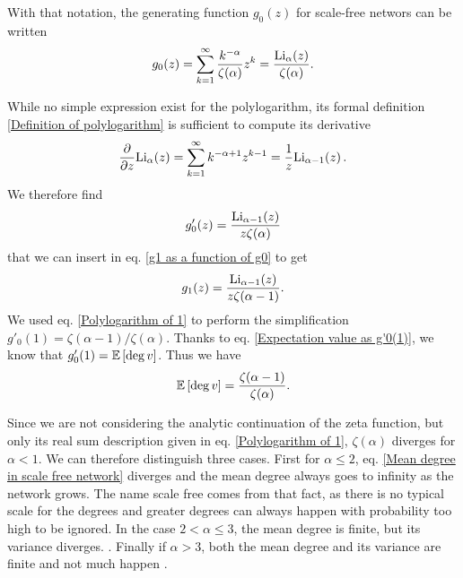 \documentclass[
11pt, %
english, %
singlespacing, %
nolistspacing, %
liststotoc, %
headsepline, %
]{MastersDoctoralThesis} %
\begin{document}
With that notation, the generating function $g_0(z)$ for scale-free networs can be written
\begin{align}
	g_0(z) = \sum_{k=1}^\infty \frac{k^{-\alpha}}{\zeta(\alpha)} z^k = \frac{\mathrm{Li}_{\alpha}\!\left(z\right)}{\zeta(\alpha)}. \label{Generating function for scale free networks}
\end{align}

While no simple expression exist for the polylogarithm, its formal definition \eqref{Definition of polylogarithm} is sufficient to compute its derivative
\begin{align}
	\frac{\partial}{\partial z} \mathrm{Li}_{\alpha}\!\left(z\right) = \sum_{k = 1}^\infty k^{-\alpha + 1} z^{k-1} = \frac{1}{z} \mathrm{Li}_{\alpha - 1}\!\left(z\right). \label{Derivative of the polylogarithm}
\end{align}
We therefore find
\begin{align}
	g'_0(z) = \frac{\mathrm{Li}_{\alpha - 1}\!\left(z\right)}{z \zeta(\alpha)}  \label{Derivative of g0 for scale free networks}
\end{align}
that we can insert in eq. \eqref{g1 as a function of g0} to get
\begin{align}
	g_1(z) =  \frac{\mathrm{Li}_{\alpha - 1}\!\left(z\right)}{z \zeta(\alpha - 1)}.
\end{align}
We used eq. \eqref{Polylogarithm of 1} to perform the simplification $g'_0(1) = \zeta(\alpha - 1)/\zeta(\alpha)$. Thanks to eq. \eqref{Expectation value as g'0(1)}, we know that $g'_0(1) = \mathbb{E}\left[ \deg{v} \right]$. Thus we have
\begin{align}
	\mathbb{E}\left[ \deg{v} \right] = \frac{\zeta(\alpha - 1)}{\zeta(\alpha)}. \label{Mean degree in scale free network}
\end{align}

Since we are not considering the analytic continuation of the zeta function, but only its real sum description given in eq. \eqref{Polylogarithm of 1}, $\zeta(\alpha)$ diverges for $\alpha < 1$. We can therefore distinguish three cases. First for $\alpha \leq 2$, eq. \eqref{Mean degree in scale free network} diverges and the mean degree always goes to infinity as the network grows. The name scale free comes from that fact, as there is no typical scale for the degrees and greater degrees can always happen with probability too high to be ignored. In the case $2 < \alpha \leq 3$, the mean degree is finite, but its variance diverges. . Finally if $\alpha > 3$, both the mean degree and its variance are finite and not much happen .
\end{document}
